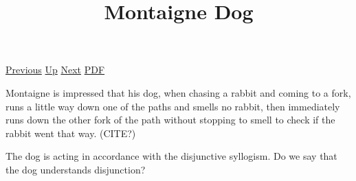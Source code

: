 \documentclass[12pt,a4paper]{report}
\begin{document}
 \href{doc/phil/PhilSituations/ClassicalBehaviorism.html}{Previous} 
 \href{doc/phil/PhilSituations.html}{Up} 
 \href{doc/phil/PhilSituations/ToothPain.html}{Next} 
 \href{doc/phil/PhilSituations/MontaigneDog.pdf}{PDF} 
\title{Montaigne Dog}
Montaigne is impressed that his dog, when chasing
a rabbit and coming to a fork, runs a little way
down one of the paths and smells no rabbit, then
immediately runs down the other fork of the path
without stopping to smell to check if the rabbit
went that way. (CITE?)

The dog is acting in accordance with the
disjunctive syllogism. Do we say that the dog
understands disjunction?
\end{document}
